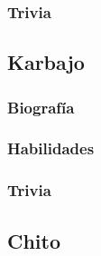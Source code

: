 \documentclass[letterpaper]{article}
\begin{document}
\subsubsection{Trivia}


\subsection{Karbajo}

\subsubsection{Biografía}
\subsubsection{Habilidades}

\subsubsection{Trivia}

\subsection{Chito}
\end{document}
